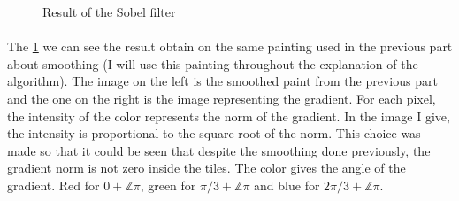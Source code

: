 \documentclass[11pt]{article}
\newcommand{\Z}{\mathbb{Z}}
\begin{document}
	\begin{figure}[h]
		\centering
		\vspace{-4mm}
		\caption{Result of the Sobel filter}
		\label{im:sob}
	\end{figure}
	\vspace{-2mm}

	\paragraph{}
	The \figurename \ref{im:sob} we can see the result obtain on the same painting used in the previous part about smoothing (I will use this painting throughout the explanation of the algorithm). The image on the left is the smoothed paint from the previous part and the one on the right is the image representing the gradient. For each pixel, the intensity of the color represents the norm of the gradient. In the image I give, the intensity is proportional to the square root of the norm. This choice was made so that it could be seen that despite the smoothing done previously, the gradient norm is not zero inside the tiles. The color gives the angle of the gradient. Red for $0+\Z \pi$, green for $\pi / 3 + \Z \pi$ and blue for $2\pi / 3 + \Z \pi$.
	
\end{document}
